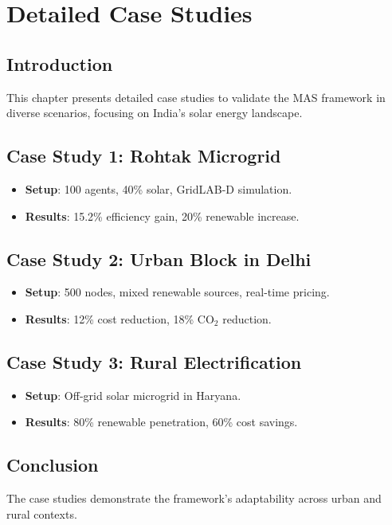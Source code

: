 \documentclass[12pt, a4paper, oneside]{book}
\begin{document}
\chapter{Detailed Case Studies}
\section{Introduction}
This chapter presents detailed case studies to validate the MAS framework in diverse scenarios, focusing on India’s solar energy landscape.

\section{Case Study 1: Rohtak Microgrid}
\begin{itemize}
    \item \textbf{Setup}: 100 agents, 40\% solar, GridLAB-D simulation.
    \item \textbf{Results}: 15.2\% efficiency gain, 20\% renewable increase.
\end{itemize}

\section{Case Study 2: Urban Block in Delhi}
\begin{itemize}
    \item \textbf{Setup}: 500 nodes, mixed renewable sources, real-time pricing.
    \item \textbf{Results}: 12\% cost reduction, 18\% CO$_2$ reduction.
\end{itemize}

\section{Case Study 3: Rural Electrification}
\begin{itemize}
    \item \textbf{Setup}: Off-grid solar microgrid in Haryana.
    \item \textbf{Results}: 80\% renewable penetration, 60\% cost savings.
\end{itemize}

\section{Conclusion}
The case studies demonstrate the framework’s adaptability across urban and rural contexts.
\end{document}
